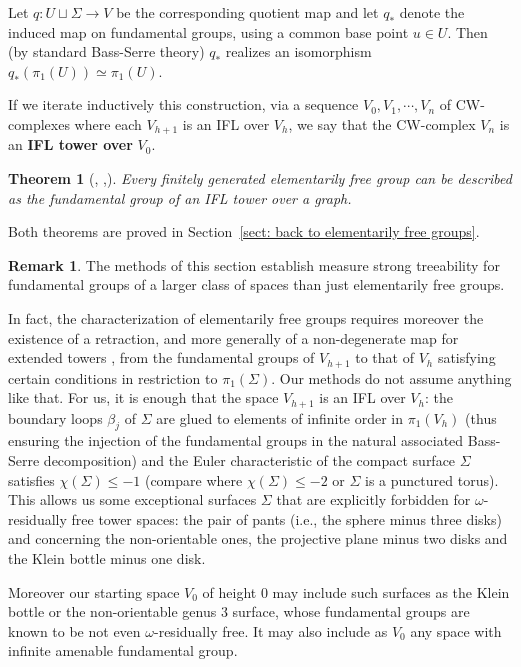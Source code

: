 \documentclass[11pt]{amsart}
\theoremstyle{definition}
\newtheorem{remark}[definition]{Remark}
\theoremstyle{plain}
\newtheorem{theorem}[definition]{Theorem}
\newcommand{\<}{\langle}
\renewcommand{\>}{\rangle}
\newcommand{\disjointunion}{\sqcup}
\newcommand{\define}[1]{\textbf{#1}}
\begin{document}
 Let $q \colon U \disjointunion \Sigma \to V$ be the  corresponding quotient map and let $q_*$ denote the induced map on fundamental groups, using a common base point $u\in U$.  Then (by standard Bass-Serre theory) $q_*$ realizes an isomorphism $q_*(\pi_1(U))\simeq \pi_1(U)$.

If we iterate inductively this construction, via
a sequence $V_0, V_1, \cdots, V_n$ of CW-complexes where each $V_{h+1}$ is an IFL over $V_h$, we say that the
CW-complex $V_n$ is an \define{IFL tower over} $V_0$.

\begin{theorem}[{\cite{SeVI}, \cite{KhM1},\cite{Guirardel-Levitt-Sklinos-2020}}]
\label{th: elem free gps as large towers}
Every finitely generated elementarily free group can be described as the fundamental group of an
IFL tower over a graph.
\end{theorem}

Both theorems are proved in Section~\ref{sect: back to elementarily free groups}.

\begin{remark}
  The methods of this section establish measure strong treeability for fundamental groups of a larger class of spaces than just elementarily free groups.

In fact, the characterization of elementarily free groups requires moreover the existence of a retraction, and more generally of a non-degenerate
map for extended towers \cite[Definition 4.5, Proposition 4.21]{Guirardel-Levitt-Sklinos-2020},
from the fundamental groups of $V_{h+1}$ to that of $V_h$ satisfying certain conditions in restriction to $\pi_1(\Sigma)$. Our methods do not assume anything like that.
  For us, it is enough that the space $V_{h+1}$ is an IFL over $V_{h}$: the boundary loops $\beta_j$ of $\Sigma$ are glued to elements of infinite order in $\pi_1(V_{h})$ (thus ensuring the injection of the fundamental groups in the natural associated Bass-Serre decomposition) and
  the Euler characteristic of the compact surface $\Sigma$ satisfies $\chi(\Sigma)\leq -1$ (compare \cite{SeVI} where $\chi(\Sigma)\leq -2$ or $\Sigma$ is a punctured torus).
 This allows us some exceptional surfaces $\Sigma$ that are explicitly forbidden for $\omega$-residually free tower spaces:
  the pair of pants (i.e., the sphere minus three disks) and concerning the non-orientable ones, the projective plane minus two disks and the Klein bottle minus one disk.

   Moreover our starting space $V_0$ of height $0$ may include such surfaces as the Klein bottle or the non-orientable genus 3 surface, whose fundamental groups are known to be not even $\omega$-residually free. It may also include  as $V_0$ any space with infinite amenable fundamental group.
 \end{remark}
\end{document}
